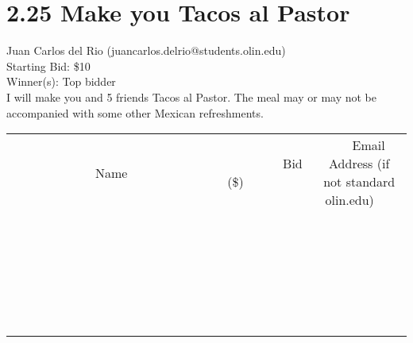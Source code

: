 \documentclass[11pt]{article}
\begin{document}
\section*{2.25 Make you Tacos al Pastor}
Juan Carlos del Rio (juancarlos.delrio@students.olin.edu) \\
Starting Bid: \$10 \\
Winner(s): 
Top bidder \\
I will make you and 5 friends Tacos al Pastor. The meal may or may not be accompanied with some other Mexican refreshments. \\[6ex]
\begin{tabular}{c c c}
~~~~~~~~~~~~~Name~~~~~~~~~~~~~ & ~~~~~~~~~Bid (\$)~~~~~~~~~ & ~~~Email Address (if not standard olin.edu)~~~ \\
 & & \\
\hline
 & & \\
\hline
 & & \\
\hline
 & & \\
\hline
 & & \\
\hline
 & & \\
\hline
 & & \\
\hline
 & & \\
\hline
 & & \\
\hline
 & & \\
\hline
 & & \\
\hline
 & & \\
\hline
 & & \\
\hline
 & & \\
\hline
 & & \\
\hline
 & & \\
\hline
 & & \\
\hline
 & & \\
\hline
 & & \\
\hline
 & & \\
\hline
 & & \\
\hline
 & & \\
\hline
 & & \\
\hline
 & & \\
\hline
 & & \\
\hline
 & & \\
\hline
\end{tabular}
\clearpage
\end{document}
